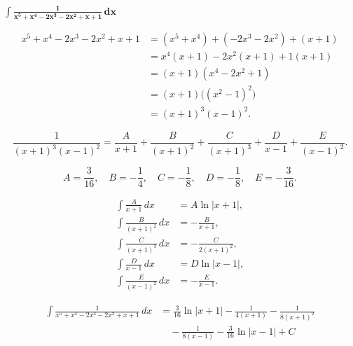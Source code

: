 $\displaystyle \mathbf{\int \frac{1}{x^{5}+x^{4}-2x^{3}-2x^{2}+x+1}\,dx}$

\nopagebreak
{}

$$
\begin{aligned}
x^{5}+x^{4}-2x^{3}-2x^{2}+x+1 
&= (x^{5}+x^{4}) + (-2x^{3}-2x^{2}) + (x+1) \\
&= x^{4}(x+1) - 2x^{2}(x+1) + 1(x+1) \\
&= (x+1)(x^{4}-2x^{2}+1) \\
&= (x+1)\big((x^{2}-1)^{2}\big) \\
&= (x+1)^{3}(x-1)^{2}.
\end{aligned}
$$

\nopagebreak
{}

$$
\frac{1}{(x+1)^{3}(x-1)^{2}} 
= \frac{A}{x+1} + \frac{B}{(x+1)^{2}} + \frac{C}{(x+1)^{3}}
+ \frac{D}{x-1} + \frac{E}{(x-1)^{2}}.
$$

\nopagebreak
{}

$$
A = \frac{3}{16},\quad B = -\frac{1}{4},\quad C = -\frac{1}{8},\quad 
D = -\frac{1}{8},\quad E = -\frac{3}{16}.
$$

\nopagebreak
{}

$$
\begin{aligned}
\int \frac{A}{x+1}\,dx &= A \ln|x+1|, \\
\int \frac{B}{(x+1)^{2}}\,dx &= -\frac{B}{x+1}, \\
\int \frac{C}{(x+1)^{3}}\,dx &= -\frac{C}{2(x+1)^{2}}, \\
\int \frac{D}{x-1}\,dx &= D \ln|x-1|, \\
\int \frac{E}{(x-1)^{2}}\,dx &= -\frac{E}{x-1}.
\end{aligned}
$$

\nopagebreak
{}

\[
\boxed{
\begin{aligned}
\int \frac{1}{x^{5}+x^{4}-2x^{3}-2x^{2}+x+1}\,dx
&= \frac{3}{16}\ln|x+1|
- \frac{1}{4(x+1)}
- \frac{1}{8(x+1)^{2}} \\[4pt]
&\quad - \frac{1}{8(x-1)}
- \frac{3}{16}\ln|x-1|
+ C
\end{aligned}
}
\]
